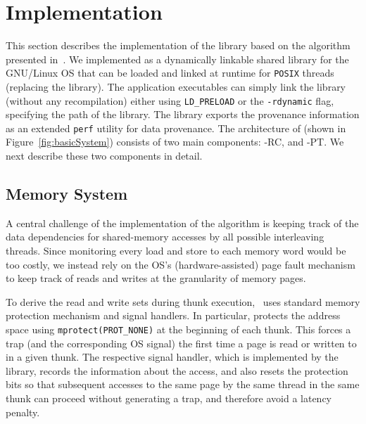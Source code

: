 \section{Implementation}
\label{sec:implementation}



This section describes the implementation of the \projecttitle library based on the algorithm presented in~. We implemented \projecttitle as a dynamically linkable shared library for the GNU/Linux OS that can be loaded and linked  at runtime for {\tt POSIX} threads (replacing the \pthreads library). The application executables can simply link the library (without any recompilation) either using {\tt LD\_PRELOAD} or the {\tt -rdynamic} flag, specifying the path of the \projecttitle library. The library exports the provenance information as an extended  {\tt perf} utility for data provenance. 
The architecture of \projecttitle (shown in Figure~\ref{fig:basicSystem}) consists of two main components: \projecttitle-RC, and \projecttitle-PT.  We next describe these two components in detail.







\subsection{Memory System}


 A central challenge of the implementation of the algorithm is keeping track of the data dependencies for shared-memory accesses by all possible interleaving threads. Since monitoring every load and store to each memory word would be too costly, we instead rely on the OS's (hardware-assisted) page fault mechanism to keep track of reads and writes at the granularity of memory pages.

To derive the read and write sets during thunk execution,  \projecttitle~uses standard memory protection  mechanism and signal handlers. In particular, \projecttitle protects the address space using {\tt mprotect(PROT\_NONE)} at the beginning of each thunk. This forces a trap (and the corresponding OS signal) the first time a page is read or written to in a given thunk. The respective signal handler, which is implemented by the \projecttitle library, records the information about the access, and also resets the protection bits so that subsequent accesses to the same page by the same thread in the same thunk can proceed without generating a trap, and therefore avoid a
latency penalty.  

